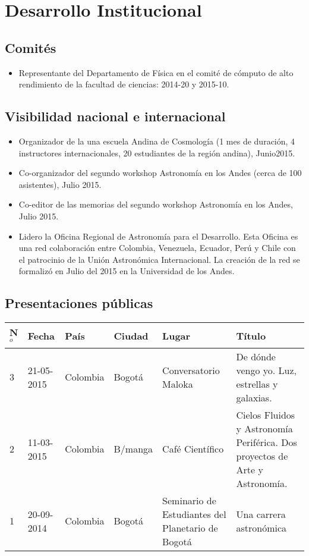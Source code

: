 \documentclass{article}
\begin{document}
\section{Desarrollo Institucional}

\subsection{Comit\'es}
\begin{itemize}
\item {Representante del Departamento de F\'isica en el comit\'e
  de c\'omputo de alto rendimiento de la facultad de ciencias}:
  2014-20 y 2015-10.  
\end{itemize}


\subsection{Visibilidad nacional e internacional}
\begin{itemize}
\item {Organizador de la una escuela Andina de Cosmolog\'ia (1 mes de
  duraci\'on, 4 instructores internacionales, 20 estudiantes de la
  regi\'on andina), Junio2015.}
\item {Co-organizador del segundo workshop Astronom\'ia en los Andes
  (cerca de 100 asistentes), Julio 2015.}
\item {Co-editor de las memorias del segundo workshop Astronom\'ia en
  los Andes, Julio 2015.}
\item {Lidero la Oficina Regional de Astronom\'ia para el
  Desarrollo. Esta Oficina es una red colaboraci\'on entre Colombia,
  Venezuela, Ecuador, Per\'u y Chile con el patrocinio de la Uni\'on
  Astron\'omica Internacional. La creaci\'on de la red se formaliz\'o
  en Julio del 2015 en la Universidad de los Andes.}   
\end{itemize}

\subsection{Presentaciones p\'ublicas}

\begin{tabular}{l l l l p{3cm} p{4cm}}\hline
N$^{o}$ & Fecha & Pa\'is & Ciudad & Lugar & T\'itulo\\\hline
3 & 21-05-2015 & Colombia & Bogot\'a & Conversatorio Maloka & De d\'onde vengo yo. Luz, estrellas y galaxias.\\
2 & 11-03-2015 & Colombia & B/manga & Caf\'e Cient\'ifico & Cielos Fluidos y Astronom\'ia Perif\'erica. Dos proyectos de Arte y Astronom\'ia.\\
1 & 20-09-2014 & Colombia & Bogot\'a & Seminario de Estudiantes del
Planetario de Bogot\'a& Una carrera astron\'omica \\\hline
\end{tabular}
\end{document}
